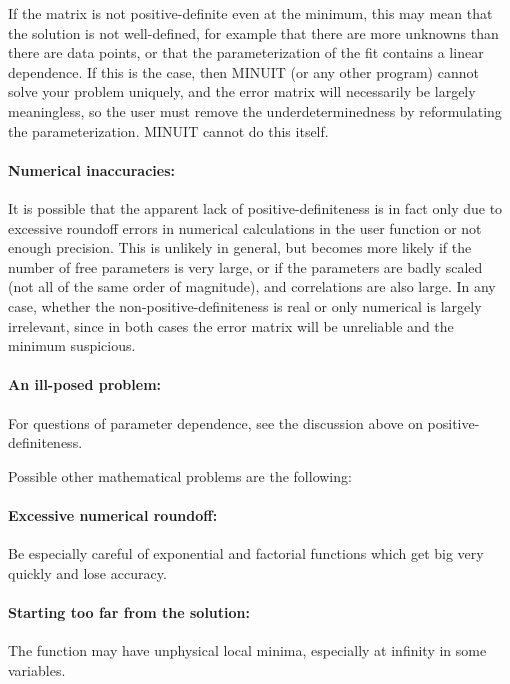 If the matrix is not positive-definite even at the minimum,
this may mean that the solution is not well-defined, for example
that there are more unknowns than there are data points, or that the
parameterization of the fit contains a linear dependence.
If this is the case, then MINUIT (or any other program) cannot solve
your problem uniquely, and the error matrix will necessarily be
largely meaningless, so the user must remove the underdeterminedness
by reformulating the parameterization. 
MINUIT cannot do this itself.

\paragraph{Numerical inaccuracies:}

It is possible that the apparent lack of positive-definiteness
is in fact only due to excessive roundoff errors in numerical
calculations in the user function or not enough precision.
This is unlikely in general, but becomes more likely if the number of
free parameters is very large, or if the parameters are badly scaled
(not all of the same order of magnitude), and correlations are
also large.
In any case, whether the non-positive-definiteness is
real or only numerical is largely irrelevant, since in both cases the
error matrix will be unreliable and the minimum suspicious.

\paragraph{An ill-posed problem:}

For questions of parameter dependence, see the discussion above
on positive-definiteness.

Possible other mathematical problems are the following:

\paragraph{Excessive numerical roundoff:}

Be especially careful of exponential and factorial functions
which get big very quickly and lose accuracy.

\paragraph{Starting too far from the solution:}

The function may have unphysical local minima, especially
at infinity in some variables.

